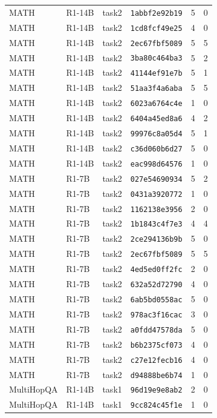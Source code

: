 \begin{longtable}{llllrr}
MATH & R1-14B & task2 & \texttt{1abbf2e92b19} & 5 & 0 \\
MATH & R1-14B & task2 & \texttt{1cd8fcf49e25} & 4 & 0 \\
MATH & R1-14B & task2 & \texttt{2ec67fbf5089} & 5 & 5 \\
MATH & R1-14B & task2 & \texttt{3ba80c464ba3} & 5 & 2 \\
MATH & R1-14B & task2 & \texttt{41144ef91e7b} & 5 & 1 \\
MATH & R1-14B & task2 & \texttt{51aa3f4a6aba} & 5 & 5 \\
MATH & R1-14B & task2 & \texttt{6023a6764c4e} & 1 & 0 \\
MATH & R1-14B & task2 & \texttt{6404a45ed8a6} & 4 & 2 \\
MATH & R1-14B & task2 & \texttt{99976c8a05d4} & 5 & 1 \\
MATH & R1-14B & task2 & \texttt{c36d060b6d27} & 5 & 0 \\
MATH & R1-14B & task2 & \texttt{eac998d64576} & 1 & 0 \\
MATH & R1-7B & task2 & \texttt{027e54690934} & 5 & 2 \\
MATH & R1-7B & task2 & \texttt{0431a3920772} & 1 & 0 \\
MATH & R1-7B & task2 & \texttt{1162138e3956} & 2 & 0 \\
MATH & R1-7B & task2 & \texttt{1b1843c4f7e3} & 4 & 4 \\
MATH & R1-7B & task2 & \texttt{2ce294136b9b} & 5 & 0 \\
MATH & R1-7B & task2 & \texttt{2ec67fbf5089} & 5 & 5 \\
MATH & R1-7B & task2 & \texttt{4ed5ed0ff2fc} & 2 & 0 \\
MATH & R1-7B & task2 & \texttt{632a52d72790} & 4 & 0 \\
MATH & R1-7B & task2 & \texttt{6ab5bd0558ac} & 5 & 0 \\
MATH & R1-7B & task2 & \texttt{978ac3f16cac} & 3 & 0 \\
MATH & R1-7B & task2 & \texttt{a0fdd47578da} & 5 & 0 \\
MATH & R1-7B & task2 & \texttt{b6b2375cf073} & 4 & 0 \\
MATH & R1-7B & task2 & \texttt{c27e12fecb16} & 4 & 0 \\
MATH & R1-7B & task2 & \texttt{d94888be6b74} & 1 & 0 \\
MultiHopQA & R1-14B & task1 & \texttt{96d19e9e8ab2} & 2 & 0 \\
MultiHopQA & R1-14B & task1 & \texttt{9cc824c45f1e} & 1 & 0 \\

\end{longtable}
